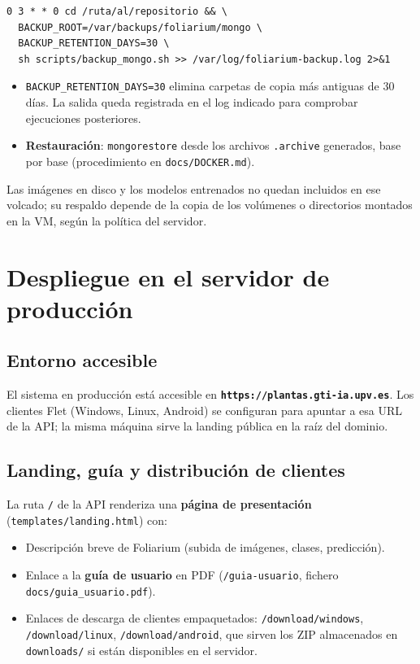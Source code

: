 \documentclass[11pt,spanish,listoffigures,listoftables]{tfgetsinf}
\begin{document}
\begin{verbatim}
0 3 * * 0 cd /ruta/al/repositorio && \
  BACKUP_ROOT=/var/backups/foliarium/mongo \
  BACKUP_RETENTION_DAYS=30 \
  sh scripts/backup_mongo.sh >> /var/log/foliarium-backup.log 2>&1
\end{verbatim}

\begin{itemize}
    \item \texttt{BACKUP\_RETENTION\_DAYS=30} elimina carpetas de copia más antiguas de 30 días. La salida queda registrada en el log indicado para comprobar ejecuciones posteriores.
    \item \textbf{Restauración}: \texttt{mongorestore} desde los archivos \texttt{.archive} generados, base por base (procedimiento en \texttt{docs/DOCKER.md}).
\end{itemize}

Las imágenes en disco y los modelos entrenados no quedan incluidos en ese volcado; su respaldo depende de la copia de los volúmenes o directorios montados en la VM, según la política del servidor.

\section{Despliegue en el servidor de producción}

\subsection{Entorno accesible}

El sistema en producción está accesible en \textbf{\texttt{https://plantas.gti-ia.upv.es}}. Los clientes Flet (Windows, Linux, Android) se configuran para apuntar a esa URL de la API; la misma máquina sirve la landing pública en la raíz del dominio.

\subsection{Landing, guía y distribución de clientes}

La ruta \texttt{/} de la API renderiza una \textbf{página de presentación} (\texttt{templates/landing.html}) con:

\begin{itemize}
    \item Descripción breve de Foliarium (subida de imágenes, clases, predicción).
    \item Enlace a la \textbf{guía de usuario} en PDF (\texttt{/guia-usuario}, fichero \texttt{docs/guia\_usuario.pdf}).
    \item Enlaces de descarga de clientes empaquetados: \texttt{/download/windows}, \texttt{/download/linux}, \texttt{/download/android}, que sirven los ZIP almacenados en \texttt{downloads/} si están disponibles en el servidor.
\end{itemize}
\end{document}
